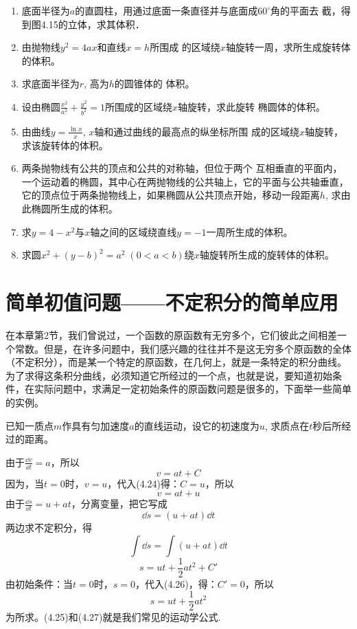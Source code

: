 \begin{ex}
\begin{enumerate}
    \item 底面半径为$a$的直圆柱，用通过底面一条直径并与底面成$60^{\circ}$角的平面去
    截，得到图4.15的立体，求其体积．
    \item 由抛物线$y^2=4ax$和直线$x=h$所围成
    的区域绕$x$轴旋转一周，求所生成旋转体的体积。
    \item 求底面半径为$r$, 高为$h$的圆锥体的
    体积。
    \item 设由椭圆$\frac{x^2}{a^2}+\frac{y^2}{b^2}=1$所围成的区域绕$x$轴旋转，求此旋转
    椭圆体的体积。
    \item 由曲线$y=\frac{\ln x}{x}$, $x$轴和通过曲线的最高点的纵坐标所围
    成的区域绕$x$轴旋转，求该旋转体的体积。
    \item 两条抛物线有公共的顶点和公共的对称轴，但位于两个
    互相垂直的平面内，一个运动着的椭圆，其中心在两抛物线的公共轴上，它的平面与公共轴垂直，它的顶点位于两条抛物线上，如果椭圆从公共顶点开始，移动一段距离$h$, 求由此椭圆所生成的体积。
    \item 求$y=4-x^2$与$x$轴之间的区域绕直线$y=-1$一周所生成的体积。
    \item 求圆$x^2+(y-b)^2=a^2\; (0<a<b)$绕$x$轴旋转所生成的旋转体的体积。
\end{enumerate}
\end{ex}

\section{简单初值问题——不定积分的简单应用}

在本章第2节，我们曾说过，一个函数的原函数有无穷多个，它们彼此之间相差一个常数。但是，在许多问题中，我们感兴趣的往往并不是这无穷多个原函数的全体（不定积分），而是某一个特定的原函数，在几何上，就是一条特定的积分曲线。为了求得这条积分曲线，必须知道它所经过的一个点，也就是说，要知道初始条件，在实际问题中，求满足一定初始条件的原函数问题是很多的，下面举一些简单的实例。

\begin{example}
    已知一质点$m$作具有匀加速度$a$的直线运动，设它的初速度为$u$, 求质点在$t$秒后所经过的距离。
\end{example}

\begin{solution}
由于$\frac{\dd v}{\dd t}=a$，所以
\begin{equation}
    v=at+C
\end{equation}
因为，当$t=0$时，$v=u$，代入(4.24)得：$C=u$，所以
\begin{equation}
    v=at+u
\end{equation}
由于$\frac{\dd s}{\dd t}=u+at$，分离变量，把它写成
\[\dd s=(u+at)\dd t\]
两边求不定积分，得
\[\int \dd s=\int (u+at)\dd t\]
\begin{equation}
    s=ut+\frac{1}{2}at^2+C'
\end{equation}
由初始条件：当$t=0$时，$s=0$，代入(4.26)，得：$C'=0$，所以
\begin{equation}
    s=ut+\frac{1}{2}at^2
\end{equation}
为所求。(4.25)和(4.27)就是我们常见的运动学公式.
\end{solution}


